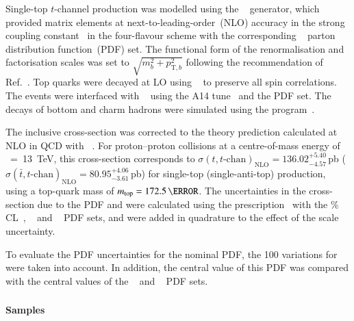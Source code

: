 Single-top $t$-channel production was modelled using the
\POWHEGBOX[v2]~\cite{Frederix:2012dh,Nason:2004rx,Frixione:2007vw,Alioli:2010xd}
generator, which provided matrix elements at next-to-leading-order~(NLO) 
accuracy in the strong coupling constant \alphas\ in the four-flavour 
scheme with the corresponding \NNPDF[3.0nlo]~\cite{Ball:2014uwa} parton
distribution function~(PDF) set.  The functional form of the
renormalisation and factorisation scales was set to
$\sqrt{m_b^2 + p_{\text{T},b}^2}$ following the
recommendation of Ref.~\cite{Frederix:2012dh}. Top quarks were decayed at
LO using \MADSPIN~\cite{Frixione:2007zp,Artoisenet:2012st} to preserve
all spin correlations.  The events were interfaced with
\PYTHIA[8.230]~\cite{Sjostrand:2014zea} using the A14
tune~\cite{ATL-PHYS-PUB-2014-021} and the \NNPDF[2.3lo] PDF set.  
The decays of bottom and charm hadrons were simulated using the
\EVTGEN[1.6.0] program~\cite{Lange:2001uf}.

The inclusive cross-section was corrected to the theory prediction calculated at NLO in QCD with 
\HATHOR[2.1]~\cite{Aliev:2010zk,Kant:2014oha}.
For proton--proton collisions at a centre-of-mass energy of \rts~=~\SI{13}{\TeV}, this cross-section corresponds to
$\sigma(t,t\text{-chan})_\text{NLO}= 136.02^{+5.40}_{-4.57}$\,pb ($\sigma(\bar{t},t\text{-chan})_\text{NLO}=80.95^{+4.06}_{-3.61}$\,pb)
for single-top (single-anti-top) production, using a top-quark mass of $\mtop = 172.5\,\GeV$.
The uncertainties in the cross-section due to the PDF and \alphas were calculated using the \PDFforLHC prescription~\cite{Butterworth:2015oua}
with the \% CL~\cite{Martin:2009iq,Martin:2009bu}, \CT[10nlo]~\cite{Lai:2010vv} 
and \NNPDF[2.3nlo]~\cite{Ball:2012cx} PDF sets,
and were added in quadrature to the effect of the scale uncertainty.



To evaluate the PDF uncertainties for the nominal PDF, the 100 variations for \NNPDF[3.0nlo] were taken into account. 
In addition, the central value of this PDF was compared with the central values of the \CT[14nnlo]~\cite{Dulat:2015mca} 
and \MMHT[nnlo]~\cite{Harland-Lang:2014zoa} PDF sets.

\subsubsection[Powheg+Herwig7]{\POWHER[7]}
\label{subsubsec:tchan_PH7}

\paragraph{Samples}

